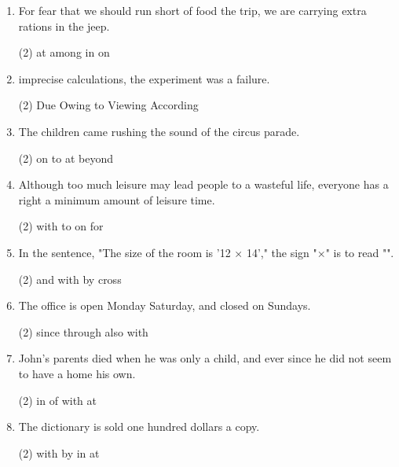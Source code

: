 \begin{enumerate}
\item For fear that we should run short of food \ttu the trip, we are carrying extra rations in the jeep.
  \begin{tasks}(2)
    \task at
    \task among
    \task in
    \task on
  \end{tasks}

\item \ttu imprecise calculations, the experiment was a failure.
  \begin{tasks}(2)
    \task Due
    \task Owing to
    \task Viewing
    \task According
  \end{tasks}

\item The children came rushing \ttu the sound of the circus parade.
  \begin{tasks}(2)
    \task on
    \task to
    \task at
    \task beyond
  \end{tasks}

\item Although too much leisure may lead people to a wasteful life, everyone has a right \ttu a minimum amount of leisure time.
  \begin{tasks}(2)
    \task with
    \task to
    \task on
    \task for
  \end{tasks}

\item In the sentence, "The size of the room is '12 × 14'," the sign "×" is to read "\ttu".
  \begin{tasks}(2)
    \task and
    \task with
    \task by
    \task cross
  \end{tasks}

\item The office is open Monday \ttu Saturday, and closed on Sundays.
  \begin{tasks}(2)
    \task since
    \task through
    \task also
    \task with
  \end{tasks}

\item John's parents died when he was only a child, and ever since he did not seem to have a home \ttu his own.
  \begin{tasks}(2)
    \task in
    \task of
    \task with
    \task at
  \end{tasks}

\item The dictionary is sold \ttu one hundred dollars a copy.
  \begin{tasks}(2)
    \task with
    \task by
    \task in
    \task at
  \end{tasks}


\end{enumerate}
